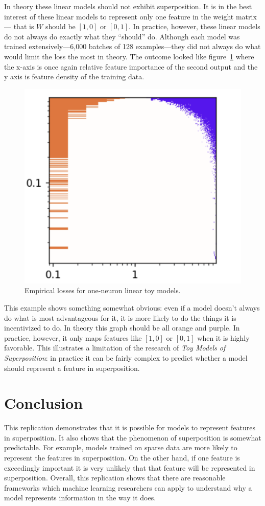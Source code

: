 \documentclass{article} %
\begin{document}
In theory these linear models should not exhibit superposition. It is in the best
interest of these linear models to represent only one feature in the weight matrix---
that is $W$ should be $[1,0]$ or $[0, 1]$. In practice, however,
these linear models do not always do exactly what they ``should'' do. Although each model was trained
extensively---6,000 batches of 128 examples---they did not always do what would
limit the loss the most in theory. The outcome looked like 
figure~\ref{fig:linear_phases} where the x-axis is once again relative feature
importance of the second output and the y axis is feature density of the training
data.

\begin{figure}[h]
    \centering
    \includegraphics[width=0.25\linewidth]{phase_changes/images/linear_phases.png}
    \captionsetup{font=footnotesize, width=0.7\linewidth} %
    \caption{
        Empirical losses for one-neuron linear toy models.
    }
    \label{fig:linear_phases}
\end{figure}

This example shows something somewhat obvious: even if a model doesn't always do
what is most advantageous for it, it is more likely to do the things it
is incentivized to do. In theory this graph should be all orange and purple. In
practice, however, it only maps features like $[1, 0]$ or $[0, 1]$ when it is
highly favorable. This illustrates a limitation of the research of \textit{Toy 
Models of Superposition}: in practice it can be fairly complex to predict whether
a model should represent a feature in superposition.

\section{Conclusion}

This replication demonstrates that it is possible for models to represent 
features in superposition. It also shows that the phenomenon of superposition is 
somewhat predictable. For example, models trained on sparse data are more
likely to represent the features in superposition. On the other
hand, if one feature is exceedingly important it is very unlikely that that
feature will be represented in superposition. Overall, this replication shows
that there are reasonable frameworks which machine learning researchers can
apply to understand why a model represents information in the way
it does.\\
\end{document}
